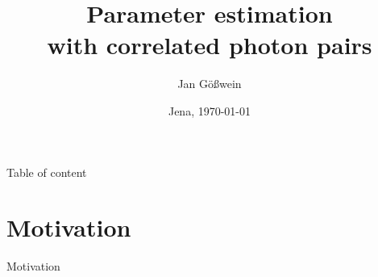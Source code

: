 \documentclass[10pt,aspectratio=43]{beamer}
\title[Parameter estimation]{Parameter estimation\\with correlated photon pairs}
\author[Jan Gößwein]{Jan Gößwein}
\date{Jena, \today}
\institute[IAP]{Institute of Applied Physics}
\begin{document}
	
	\showheadlinefalse
	\begin{frame}[noframenumbering]
		\titlepage
	\end{frame}
	
	
	
	
	\showheadlinefalse
	\begin{frame}{Table of content}
		\tableofcontents
	\end{frame}
	
	\showheadlinetrue
	
	\section{Motivation}
	\begin{frame}{Motivation}
	\end{frame}
	
\end{document}
